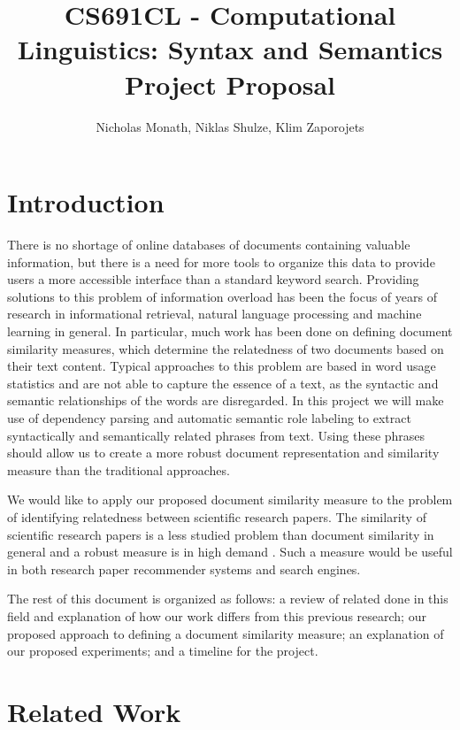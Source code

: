 \documentclass[11pt]{article}
\begin{document}
  \title{CS691CL - Computational Linguistics: Syntax and Semantics \\ Project Proposal}
  \author{Nicholas Monath, Niklas Shulze, Klim Zaporojets}
  \maketitle
  
  
  
\section{Introduction}

There is no shortage of online databases of documents containing valuable information, but there is a need for more tools to organize this data to provide users a more accessible interface than a standard keyword search. Providing solutions to this problem of information overload has been the focus of years of research in informational retrieval, natural language processing and machine learning in general. In particular, much work has been done on defining document similarity measures, which determine the relatedness of two documents based on their text content. Typical approaches to this problem are based in word usage statistics and are not able to capture the essence of a text, as the syntactic and semantic relationships of the words are disregarded. In this project we will make use of dependency parsing and automatic semantic role labeling to extract syntactically and semantically related phrases from text. Using these phrases should allow us to create a more robust document representation and similarity measure than the traditional approaches. 

We would like to apply our proposed document similarity measure to the problem of identifying relatedness between scientific research papers. The similarity of scientific research papers is a less studied problem than document similarity in general and a robust measure is in high demand \cite{Hurtado2013}. Such a measure would be useful in both research paper recommender systems and search engines. 

The rest of this document is organized as follows: a review of related done in this field and explanation of how our work differs from this previous research; our proposed approach to defining a document similarity measure; an explanation of our proposed experiments; and a timeline for the project.

\section{Related Work} \label{sec:RelatedWork}
\end{document}
